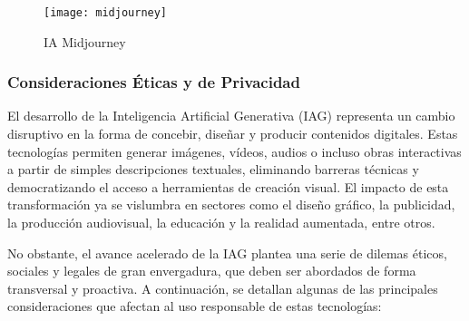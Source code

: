 \begin{figure}[H]
    \centering
    \texttt{[image: midjourney]}
    \caption{IA Midjourney}
    \label{fig:midjourney}
\end{figure}

\subsubsection{Consideraciones Éticas y de Privacidad}

El desarrollo de la Inteligencia Artificial Generativa (IAG) representa un cambio disruptivo en la forma de concebir, diseñar y producir contenidos digitales. Estas tecnologías permiten generar imágenes, vídeos, audios o incluso obras interactivas a partir de simples descripciones textuales, eliminando barreras técnicas y democratizando el acceso a herramientas de creación visual. El impacto de esta transformación ya se vislumbra en sectores como el diseño gráfico, la publicidad, la producción audiovisual, la educación y la realidad aumentada, entre otros.

No obstante, el avance acelerado de la IAG plantea una serie de dilemas éticos, sociales y legales de gran envergadura, que deben ser abordados de forma transversal y proactiva. A continuación, se detallan algunas de las principales consideraciones que afectan al uso responsable de estas tecnologías:

